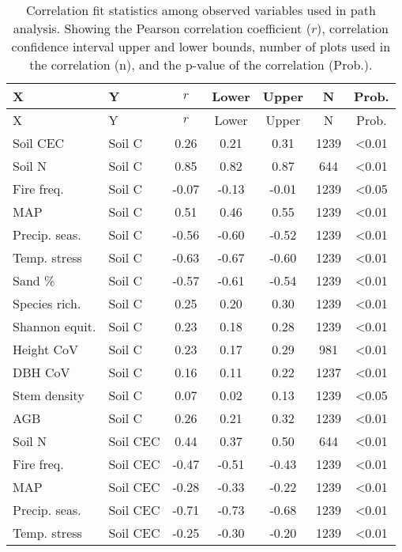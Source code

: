\begin{longtable}{llS[table-format=-1.2]S[table-format=-1.2]S[table-format=-1.2]S[table-format=4.0]S[table-format=<1.2]}
\caption[Correlation fit statistics]{Correlation fit statistics among observed variables used in path analysis. Showing the Pearson correlation coefficient ($r$), correlation confidence interval upper and lower bounds, number of plots used in the correlation (n), and the p-value of the correlation (Prob.).} 
\label{befr:corr_ci} \\
\toprule
{X} & {Y} & {$r$} & {Lower} & {Upper} & {N} & {Prob.} \\ 
\midrule
\endfirsthead
\toprule
{X} & {Y} & {$r$} & {Lower} & {Upper} & {N} & {Prob.} \\ 
\midrule
\endhead
Soil CEC & Soil C & 0.26 & 0.21 & 0.31 & 1239 & <0.01 \\ 
Soil N & Soil C & 0.85 & 0.82 & 0.87 & 644 & <0.01 \\ 
Fire freq. & Soil C & -0.07 & -0.13 & -0.01 & 1239 & <0.05 \\ 
MAP & Soil C & 0.51 & 0.46 & 0.55 & 1239 & <0.01 \\ 
Precip. seas. & Soil C & -0.56 & -0.60 & -0.52 & 1239 & <0.01 \\ 
Temp. stress & Soil C & -0.63 & -0.67 & -0.60 & 1239 & <0.01 \\ 
Sand \% & Soil C & -0.57 & -0.61 & -0.54 & 1239 & <0.01 \\ 
Species rich. & Soil C & 0.25 & 0.20 & 0.30 & 1239 & <0.01 \\ 
Shannon equit. & Soil C & 0.23 & 0.18 & 0.28 & 1239 & <0.01 \\ 
Height CoV & Soil C & 0.23 & 0.17 & 0.29 & 981 & <0.01 \\ 
DBH CoV & Soil C & 0.16 & 0.11 & 0.22 & 1237 & <0.01 \\ 
Stem density & Soil C & 0.07 & 0.02 & 0.13 & 1239 & <0.05 \\ 
AGB & Soil C & 0.26 & 0.21 & 0.32 & 1239 & <0.01 \\ 
Soil N & Soil CEC & 0.44 & 0.37 & 0.50 & 644 & <0.01 \\ 
Fire freq. & Soil CEC & -0.47 & -0.51 & -0.43 & 1239 & <0.01 \\ 
MAP & Soil CEC & -0.28 & -0.33 & -0.22 & 1239 & <0.01 \\ 
Precip. seas. & Soil CEC & -0.71 & -0.73 & -0.68 & 1239 & <0.01 \\ 
Temp. stress & Soil CEC & -0.25 & -0.30 & -0.20 & 1239 & <0.01 \\ 

\end{longtable}
